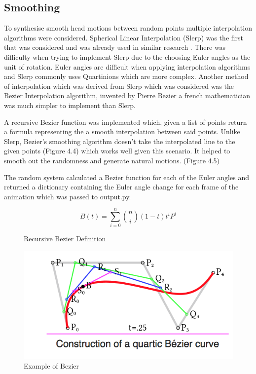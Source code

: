 \documentclass[bsc,frontabs,twoside,singlespacing,parskip]{infthesis}
\begin{document}

\subsection{Smoothing}

To synthesise smooth head motions between random points multiple interpolation algorithms were considered. Spherical Linear Interpolation (Slerp) was the first that was considered and was already used in similar research \cite{rigid_head_motion}. There was difficulty when trying to implement Slerp due to the choosing Euler angles as the unit of rotation. Euler angles are difficult when applying interpolation algorithms \cite{quartionions} and Slerp commonly uses Quartinions which are more complex. Another method of interpolation which was derived from Slerp which was considered was the Bezier Interpolation algorithm, invented by Pierre Bezier a french mathematician was much simpler to implement than Slerp.

A recursive Bezier function was implemented which, given a list of points return a formula representing the a smooth interpolation between said points. Unlike Slerp, Bezier's smoothing algorithm doesn't take the interpolated line to the given points (Figure 4.4) which works well given this scenario. It helped to smooth out the randomness and generate natural motions. (Figure 4.5)

The random system calculated a Bezier function for each of the Euler angles and returned a dictionary containing the Euler angle change for each frame of the animation which was passed to output.py.

\begin{figure}
	$$ B(t) = \sum_{i=0}^n {n \choose i} (1-t) t^i P^i $$
	\caption{Recursive Bezier Definition} 
\end{figure}

\begin{figure}
	\includegraphics[width=1\textwidth]{bezier_example.png}
	\caption{Example of Bezier}
\end{figure}
\end{document}
